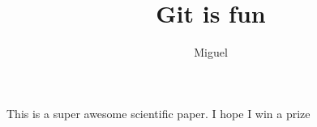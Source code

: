 \documentclass[10pt]{article}
\author{Miguel}
\title{Git is fun}
\begin{document}
	\maketitle

	This is a super awesome scientific paper.
	I hope I win a prize
\end{document}
